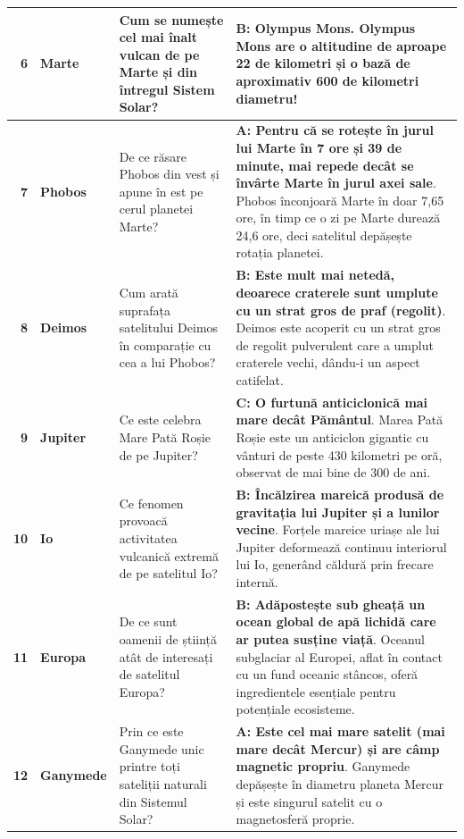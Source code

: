 \begin{longtable}{@{}r >{\raggedright\arraybackslash}p{2.7cm} >{\raggedright\arraybackslash}p{4.8cm} >{\raggedright\arraybackslash}p{6.5cm}@{}}
\textbf{6} & \textbf{Marte} & Cum se numește cel mai înalt vulcan de pe Marte și din întregul Sistem Solar? & \textbf{B: Olympus Mons}. {\footnotesize Olympus Mons are o altitudine de aproape 22 de kilometri și o bază de aproximativ 600 de kilometri diametru!} \\ \midrule
\textbf{7} & \textbf{Phobos} & De ce răsare Phobos din vest și apune în est pe cerul planetei Marte? & \textbf{A: Pentru că se rotește în jurul lui Marte în 7 ore și 39 de minute, mai repede decât se învârte Marte în jurul axei sale}. {\footnotesize Phobos înconjoară Marte în doar 7,65 ore, în timp ce o zi pe Marte durează 24,6 ore, deci satelitul depășește rotația planetei.} \\ \midrule
\textbf{8} & \textbf{Deimos} & Cum arată suprafața satelitului Deimos în comparație cu cea a lui Phobos? & \textbf{B: Este mult mai netedă, deoarece craterele sunt umplute cu un strat gros de praf (regolit)}. {\footnotesize Deimos este acoperit cu un strat gros de regolit pulverulent care a umplut craterele vechi, dându-i un aspect catifelat.} \\ \midrule
\textbf{9} & \textbf{Jupiter} & Ce este celebra \guillemotleft{}Mare Pată Roșie\guillemotright{} de pe Jupiter? & \textbf{C: O furtună anticiclonică mai mare decât Pământul}. {\footnotesize Marea Pată Roșie este un anticiclon gigantic cu vânturi de peste 430 kilometri pe oră, observat de mai bine de 300 de ani.} \\ \midrule
\textbf{10} & \textbf{Io} & Ce fenomen provoacă activitatea vulcanică extremă de pe satelitul Io? & \textbf{B: Încălzirea mareică produsă de gravitația lui Jupiter și a lunilor vecine}. {\footnotesize Forțele mareice uriașe ale lui Jupiter deformează continuu interiorul lui Io, generând căldură prin frecare internă.} \\ \midrule
\textbf{11} & \textbf{Europa} & De ce sunt oamenii de știință atât de interesați de satelitul Europa? & \textbf{B: Adăpostește sub gheață un ocean global de apă lichidă care ar putea susține viață}. {\footnotesize Oceanul subglaciar al Europei, aflat în contact cu un fund oceanic stâncos, oferă ingredientele esențiale pentru potențiale ecosisteme.} \\ \midrule
\textbf{12} & \textbf{Ganymede} & Prin ce este Ganymede unic printre toți sateliții naturali din Sistemul Solar? & \textbf{A: Este cel mai mare satelit (mai mare decât Mercur) și are câmp magnetic propriu}. {\footnotesize Ganymede depășește în diametru planeta Mercur și este singurul satelit cu o magnetosferă proprie.} \\ \midrule

\end{longtable}
